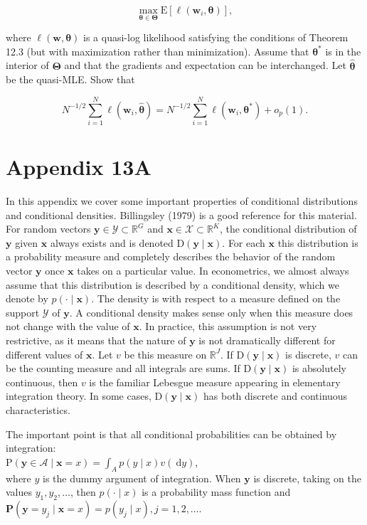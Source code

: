 \documentclass[10pt]{article}
\begin{document}
$$
\max _{\boldsymbol{\theta} \in \boldsymbol{\Theta}} \mathrm{E}\left[\ell\left(\mathbf{w}_{i}, \boldsymbol{\theta}\right)\right],
$$

where $\ell(\mathbf{w}, \boldsymbol{\theta})$ is a quasi-log likelihood satisfying the conditions of Theorem 12.3 (but with maximization rather than minimization). Assume that $\boldsymbol{\theta}^{*}$ is in the interior of $\boldsymbol{\Theta}$ and that the gradients and expectation can be interchanged. Let $\hat{\boldsymbol{\theta}}$ be the quasi-MLE. Show that

$$
N^{-1 / 2} \sum_{i=1}^{N} \ell\left(\mathbf{w}_{i}, \hat{\boldsymbol{\theta}}\right)=N^{-1 / 2} \sum_{i=1}^{N} \ell\left(\mathbf{w}_{i}, \boldsymbol{\theta}^{*}\right)+o_{p}(1) .
$$

\section*{Appendix 13A}
In this appendix we cover some important properties of conditional distributions and conditional densities. Billingsley (1979) is a good reference for this material. For random vectors $\mathbf{y} \in \mathscr{Y} \subset \mathbb{R}^{G}$ and $\mathbf{x} \in \mathscr{X} \subset \mathbb{R}^{K}$, the conditional distribution of $\mathbf{y}$ given $\mathbf{x}$ always exists and is denoted $\mathrm{D}(\mathbf{y} \mid \mathbf{x})$. For each $\mathbf{x}$ this distribution is a probability measure and completely describes the behavior of the random vector $\mathbf{y}$ once $\mathbf{x}$ takes on a particular value. In econometrics, we almost always assume that this distribution is described by a conditional density, which we denote by $p(\cdot \mid \mathbf{x})$. The density is with respect to a measure defined on the support $\mathscr{Y}$ of $\mathbf{y}$. A conditional density makes sense only when this measure does not change with the value of $\mathbf{x}$. In practice, this assumption is not very restrictive, as it means that the nature of $\mathbf{y}$ is not dramatically different for different values of $\mathbf{x}$. Let $v$ be this measure on $\mathbb{R}^{J}$. If $\mathrm{D}(\mathbf{y} \mid \mathbf{x})$ is discrete, $v$ can be the counting measure and all integrals are sums. If $\mathrm{D}(\mathbf{y} \mid \mathbf{x})$ is absolutely continuous, then $v$ is the familiar Lebesgue measure appearing in elementary integration theory. In some cases, $\mathrm{D}(\mathbf{y} \mid \mathbf{x})$ has both discrete and continuous characteristics.

The important point is that all conditional probabilities can be obtained by integration:\\
$\mathrm{P}(\mathbf{y} \in \mathscr{A} \mid \mathbf{x}=x)=\int_{A} p(y \mid x) v(\mathrm{~d} y)$,\\
where $y$ is the dummy argument of integration. When $\mathbf{y}$ is discrete, taking on the values $y_{1}, y_{2}, \ldots$, then $p(\cdot \mid x)$ is a probability mass function and $\mathbf{P}\left(\mathbf{y}=y_{j} \mid \mathbf{x}=x\right)= p\left(y_{j} \mid x\right), j=1,2, \ldots$.
\end{document}
